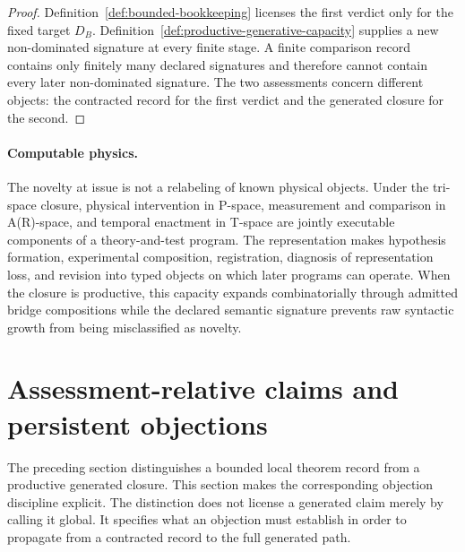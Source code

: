 \documentclass[11pt]{article}
\theoremstyle{definition}
\begin{document}
\begin{proof}
Definition~\ref{def:bounded-bookkeeping} licenses the first verdict only for the
fixed target $D_B$. Definition~\ref{def:productive-generative-capacity} supplies a
new non-dominated signature at every finite stage. A finite comparison record
contains only finitely many declared signatures and therefore cannot contain every
later non-dominated signature. The two assessments concern different objects: the
contracted record for the first verdict and the generated closure for the second.
\end{proof}

\paragraph{Computable physics.}
The novelty at issue is not a relabeling of known physical objects. Under the
tri-space closure, physical intervention in P-space, measurement and comparison in
A(R)-space, and temporal enactment in T-space are jointly executable components of
a theory-and-test program. The representation makes hypothesis formation,
experimental composition, registration, diagnosis of representation loss, and
revision into typed objects on which later programs can operate. When the closure
is productive, this capacity expands combinatorially through admitted bridge
compositions while the declared semantic signature prevents raw syntactic growth
from being misclassified as novelty.

\section{Assessment-relative claims and persistent objections}
\label{supp:assessment-relative}

The preceding section distinguishes a bounded local theorem record from a
productive generated closure. This section makes the corresponding objection
discipline explicit. The distinction does not license a generated claim merely by
calling it global. It specifies what an objection must establish in order to
propagate from a contracted record to the full generated path.
\end{document}
